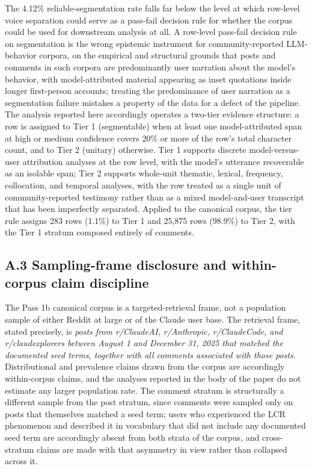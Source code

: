 \documentclass[11pt]{article}
\begin{document}
The 4.12\% reliable-segmentation rate falls far below the level at which row-level voice separation could serve as a pass-fail decision rule for whether the corpus could be used for downstream analysis at all. A row-level pass-fail decision rule on segmentation is the wrong epistemic instrument for community-reported LLM-behavior corpora, on the empirical and structural grounds that posts and comments in such corpora are predominantly user narration about the model's behavior, with model-attributed material appearing as inset quotations inside longer first-person accounts; treating the predominance of user narration as a segmentation failure mistakes a property of the data for a defect of the pipeline. The analysis reported here accordingly operates a two-tier evidence structure: a row is assigned to Tier 1 (segmentable) when at least one model-attributed span at high or medium confidence covers 20\% or more of the row's total character count, and to Tier 2 (unitary) otherwise. Tier 1 supports discrete model-versus-user attribution analyses at the row level, with the model's utterance recoverable as an isolable span; Tier 2 supports whole-unit thematic, lexical, frequency, collocation, and temporal analyses, with the row treated as a single unit of community-reported testimony rather than as a mixed model-and-user transcript that has been imperfectly separated. Applied to the canonical corpus, the tier rule assigns 283 rows (1.1\%) to Tier 1 and 25,875 rows (98.9\%) to Tier 2, with the Tier 1 stratum composed entirely of comments.

\subsection*{A.3 Sampling-frame disclosure and within-corpus claim discipline}

The Pass 1b canonical corpus is a targeted-retrieval frame, not a population sample of either Reddit at large or of the Claude user base. The retrieval frame, stated precisely, is \emph{posts from r/ClaudeAI, r/Anthropic, r/ClaudeCode, and r/claudexplorers between August 1 and December 31, 2025 that matched the documented seed terms, together with all comments associated with those posts}. Distributional and prevalence claims drawn from the corpus are accordingly within-corpus claims, and the analyses reported in the body of the paper do not estimate any larger population rate. The comment stratum is structurally a different sample from the post stratum, since comments were sampled only on posts that themselves matched a seed term; users who experienced the LCR phenomenon and described it in vocabulary that did not include any documented seed term are accordingly absent from both strata of the corpus, and cross-stratum claims are made with that asymmetry in view rather than collapsed across it.
\end{document}
